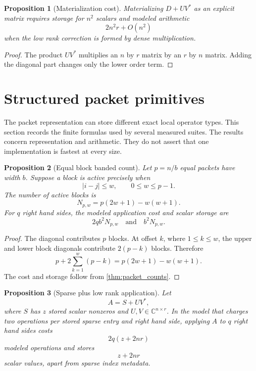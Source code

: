 \documentclass{aomart}
\newtheorem{proposition}[proposition]{Proposition}
\theoremstyle{definition}
\theoremstyle{remark}
\newcommand{\CC}{\mathbb C}
\newcommand{\abs}[1]{\left\lvert#1\right\rvert}
\begin{document}
\begin{proposition}[Materialization cost]\label{prop:materialization_cost}
Materializing \(D+UV^*\) as an explicit matrix requires storage for \(n^2\) scalars and modeled arithmetic
\[
2n^2r+O(n^2)
\]
when the low rank correction is formed by dense multiplication.
\end{proposition}

\begin{proof}
The product \(UV^*\) multiplies an \(n\) by \(r\) matrix by an \(r\) by \(n\) matrix. Adding the diagonal part changes only the lower order term.
\end{proof}

\section{Structured packet primitives}\label{sec:primitives}

The packet representation can store different exact local operator types. This section records the finite formulas used by several measured suites. The results concern representation and arithmetic. They do not assert that one implementation is fastest at every size.

\begin{proposition}[Equal block banded count]\label{prop:block_banded_count}
Let \(p=n/b\) equal packets have width \(b\). Suppose a block is active precisely when
\[
\abs{i-j}\leq w,
\qquad
0\leq w\leq p-1.
\]
The number of active blocks is
\[
\boxed{
N_{p,w}
=
p(2w+1)-w(w+1).
}
\]
For \(q\) right hand sides, the modeled application cost and scalar storage are
\[
\boxed{
2qb^2N_{p,w}
\quad\text{and}\quad
b^2N_{p,w}.
}
\]
\end{proposition}

\begin{proof}
The diagonal contributes \(p\) blocks. At offset \(k\), where \(1\leq k\leq w\), the upper and lower block diagonals contribute \(2(p-k)\) blocks. Therefore
\[
p+2\sum_{k=1}^{w}(p-k)
=
p(2w+1)-w(w+1).
\]
The cost and storage follow from \cref{thm:packet_counts}.
\end{proof}

\begin{proposition}[Sparse plus low rank application]\label{prop:sparse_low_rank}
Let
\[
A=S+UV^*,
\]
where \(S\) has \(z\) stored scalar nonzeros and \(U,V\in\CC^{n\times r}\). In the model that charges two operations per stored sparse entry and right hand side, applying \(A\) to \(q\) right hand sides costs
\[
\boxed{
2q(z+2nr)
}
\]
modeled operations and stores
\[
\boxed{
z+2nr
}
\]
scalar values, apart from sparse index metadata.
\end{proposition}
\end{document}
